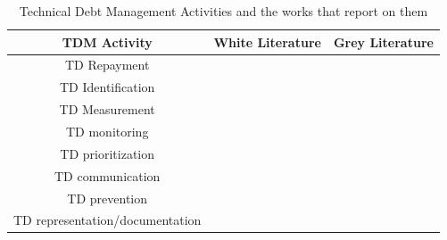 \documentclass[manuscript]{acmart}
\begin{document}
\begin{table}[h!]
    
\centering
\begin{tabular}{|c|c|c|}
    \hline
    TDM Activity & White Literature & Grey Literature \\ \hline
    TD Repayment & ~\cite{10.1145/3084226.3084248, 10.1145/3387906.3388623} &  \\ \hline
    TD Identification & ~\cite{Klotins2018/3183519.3183539, CicoTradeoffs} & \\ \hline
    TD Measurement & & ~\cite{Qualityv77:online, Whopayso60:online}\\ \hline
    TD monitoring & ~\cite{Besker2018} & \\ \hline
 TD prioritization &  ~\cite{9820390} & ~\cite{techolut25:online, HowtoGet43:online}\\ \hline
TD communication & & ~\cite{FowlerBottlenecks} \\ \hline
TD prevention & ~\cite{SanchezGordon2016} & ~\cite{Creating18:online}\\ \hline
TD representation/documentation & ~\cite{Chicote:2017} & \\ \hline
    \end{tabular}

\caption{Technical Debt Management Activities and the works that report on them}
  \label{tab:TDMactivities}
\end{table}




\end{document}
